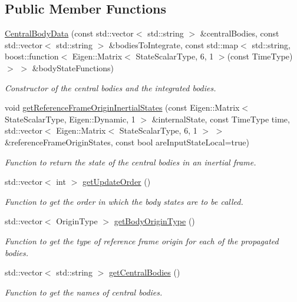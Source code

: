 \subsection*{Public Member Functions}
\begin{DoxyCompactItemize}
\item 
\hyperlink{classtudat_1_1propagators_1_1CentralBodyData_af3cd6886afefbd57578d501a230b9818}{Central\+Body\+Data} (const std\+::vector$<$ std\+::string $>$ \&central\+Bodies, const std\+::vector$<$ std\+::string $>$ \&bodies\+To\+Integrate, const std\+::map$<$ std\+::string, boost\+::function$<$ Eigen\+::\+Matrix$<$ State\+Scalar\+Type, 6, 1 $>$(const Time\+Type) $>$ $>$ \&body\+State\+Functions)
\begin{DoxyCompactList}\small\item\em Constructor of the central bodies and the integrated bodies. \end{DoxyCompactList}\item 
void \hyperlink{classtudat_1_1propagators_1_1CentralBodyData_af71145449db77825d62cc1ff9263b5fe}{get\+Reference\+Frame\+Origin\+Inertial\+States} (const Eigen\+::\+Matrix$<$ State\+Scalar\+Type, Eigen\+::\+Dynamic, 1 $>$ \&internal\+State, const Time\+Type time, std\+::vector$<$ Eigen\+::\+Matrix$<$ State\+Scalar\+Type, 6, 1 $>$ $>$ \&reference\+Frame\+Origin\+States, const bool are\+Input\+State\+Local=true)
\begin{DoxyCompactList}\small\item\em Function to return the state of the central bodies in an inertial frame. \end{DoxyCompactList}\item 
std\+::vector$<$ int $>$ \hyperlink{classtudat_1_1propagators_1_1CentralBodyData_ae91f78f87313f86cab510d0061b24207}{get\+Update\+Order} ()
\begin{DoxyCompactList}\small\item\em Function to get the order in which the body states are to be called. \end{DoxyCompactList}\item 
std\+::vector$<$ Origin\+Type $>$ \hyperlink{classtudat_1_1propagators_1_1CentralBodyData_a64c84ff949475898c8a7bf4bb9803cfc}{get\+Body\+Origin\+Type} ()
\begin{DoxyCompactList}\small\item\em Function to get the type of reference frame origin for each of the propagated bodies. \end{DoxyCompactList}\item 
std\+::vector$<$ std\+::string $>$ \hyperlink{classtudat_1_1propagators_1_1CentralBodyData_a088730d334bb63d0ce1010a7ef020d95}{get\+Central\+Bodies} ()
\begin{DoxyCompactList}\small\item\em Function to get the names of central bodies. \end{DoxyCompactList}\end{DoxyCompactItemize}


